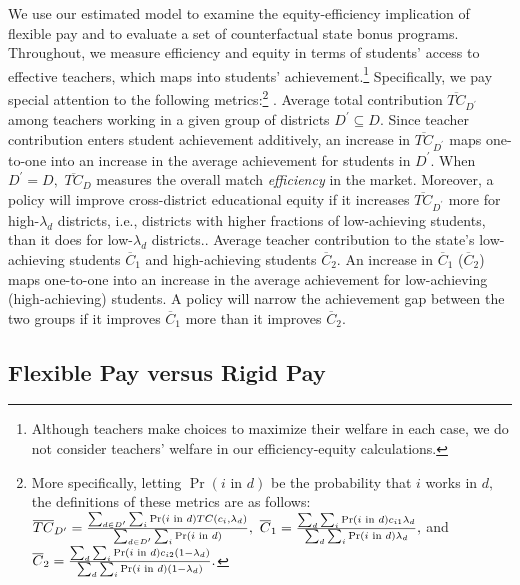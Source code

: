 \documentclass[notitlepage,12pt]{article}%
\begin{document}
We use our estimated model to examine the equity-efficiency implication of
flexible pay and to evaluate a set of counterfactual state bonus programs.
Throughout, we measure efficiency and equity in terms of students' access to
effective teachers, which maps into students' achievement.\footnote{Although
teachers make choices to maximize their welfare in each case, we do not
consider teachers' welfare in our efficiency-equity calculations.}
Specifically, we pay special attention to the following metrics:\footnote{More
specifically, letting $\Pr\left(  i\text{ in }d\right)  $ be the probability
that $i$ works in $d,$ the definitions of these metrics are as follows:
$\overline{TC}_{D^{\prime}}=\frac{\sum_{d\in D^{\prime}}\sum_{i}\Pr\left(
i\text{ in }d\right)  {\small TC}\left(  c_{i},\lambda_{d}\right)  }%
{\sum_{d\in D^{\prime}}\sum_{i}\Pr\left(  i\text{ in }d\right)  },$
$\overline{C}_{1}=\frac{\sum_{d}\sum_{i}\Pr\left(  i\text{ in }d\right)
{\small c}_{i1}\lambda_{d}}{\sum_{d}\sum_{i}\Pr\left(  i\text{ in }d\right)
\lambda_{d}},$ and $\overline{C}_{2}=\frac{\sum_{d}\sum_{i}\Pr\left(  i\text{
in }d\right)  {\small c}_{i2}\left(  1-{\small \lambda}_{d}\right)  }{\sum
_{d}\sum_{i}\Pr\left(  i\text{ in }d\right)  \left(  1-{\small \lambda}%
_{d}\right)  }.$} . Average total contribution $\overline
{TC}_{D^{\prime}}$ among teachers working in a given group of districts
$D^{\prime}\subseteq D$. Since teacher contribution enters student achievement
additively, an increase in $\overline{TC}_{D^{\prime}}$ maps one-to-one into
an increase in the average achievement for students in $D^{\prime}.$ When
$D^{\prime}=D,$ $\overline{TC}_{D}$ measures the overall match
\emph{efficiency} in the market. Moreover, a policy will improve
cross-district educational equity if it increases $\overline{TC}_{D^{\prime}}$
more for high-$\lambda_{d}$ districts, i.e., districts with higher fractions
of low-achieving students, than it does for low-$\lambda_{d}$
districts.. Average teacher contribution to the state's low-achieving
students $\overline{C}_{1}$ and high-achieving students $\overline{C}_{2}$. An
increase in $\overline{C}_{1}$ ($\overline{C}_{2}$) maps one-to-one into an
increase in the average achievement for low-achieving (high-achieving)
students. A policy will narrow the achievement gap between the two groups if
it improves $\overline{C}_{1}$ more than it improves $\overline{C}_{2}$.

\subsection{Flexible Pay versus Rigid Pay\label{rigid}}
\end{document}
